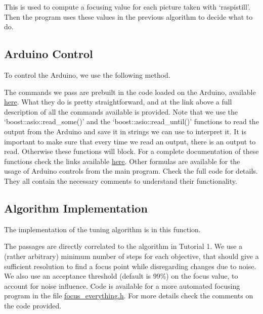 \documentclass[a4paper]{article}
\begin{document}
			This is used to compute a focusing value for each picture taken with `raspistill'.
			Then the program uses these values in the previous algorithm to decide what to do.
			
	\subsection*{Arduino Control}
	
			To control the Arduino, we use the following method.
			
		

			The commands we pass are prebuilt in the code loaded on the Arduino, available \href{https://github.com/OpenLabTools/Microscope/tree/master/Arduino}{here}.
			What they do is pretty straightforward, and at the link above a full description of all the commands available is provided.
			Note that we use the `boost::asio::read\_some()' and the `boost::asio::read\_until()' functions to  read the output from the Arduino and save it in strings we can use to interpret it.
			It is important to make sure that every time we read an output, there is an output to read. 
			Otherwise these functions will block.
			For a complete documentation of these functions check the links available \href{http://www.boost.org/doc/libs/1_54_0/doc/html/boost_asio/overview/serial\_ports.html}{here}.
			Other formulas are available for the usage of Arduino controls from the main program.
			Check the full code for details.
			They all contain the necessary comments to understand their functionality.
			
	\subsection*{Algorithm Implementation}
	
			The implementation of the tuning algorithm is in this function.
			
		
			
			The passages are directly correlated to the algorithm in Tutorial 1.
			We use a (rather arbitrary) minimum number of steps for each objective, that should give a sufficient resolution to find a focus point while disregarding changes due to noise.
			We also use an acceptance threshold (default is 99\%) on the focus value, to account for noise influence.
			Code is available for a more automated focusing program in the file \href{https://github.com/OpenLabTools/Microscope/tree/master/Raspberry\%20Pi}{focus\_everything.h}.
			For more details check the comments on the code provided.
			
\end{document}
